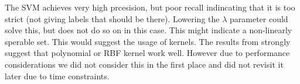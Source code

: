 \documentclass{article}
\begin{document}
The SVM achieves very high prcesision, but poor recall indincating that it is too strict (not giving labels that should be there). Lowering the $\lambda$ parameter could solve this, but does not do so on in this case. This might indicate a non-linearly sperable set. This would suggest the usage of kernels. The results from \cite{joachims_text_1998} strongly suggest that polynomial or RBF kernel work well. However due to performance considerations we did not consider this in the first place and did not revisit it later due to time constraints.

\printbibliography
\end{document}
